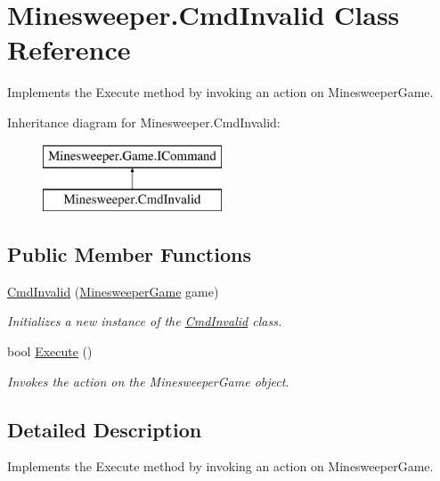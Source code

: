 \hypertarget{class_minesweeper_1_1_cmd_invalid}{\section{Minesweeper.\+Cmd\+Invalid Class Reference}
\label{class_minesweeper_1_1_cmd_invalid}
}


Implements the Execute method by invoking an action on Minesweeper\+Game.  


Inheritance diagram for Minesweeper.\+Cmd\+Invalid\+:\begin{figure}[H]
\begin{center}
\leavevmode
\includegraphics[height=2.000000cm]{class_minesweeper_1_1_cmd_invalid}
\end{center}
\end{figure}
\subsection*{Public Member Functions}
\begin{DoxyCompactItemize}
\item 
\hyperlink{class_minesweeper_1_1_cmd_invalid_a7bfd65d59c12ac6f90b82772e562a288}{Cmd\+Invalid} (\hyperlink{class_minesweeper_1_1_game_1_1_minesweeper_game}{Minesweeper\+Game} game)
\begin{DoxyCompactList}\small\item\em Initializes a new instance of the \hyperlink{class_minesweeper_1_1_cmd_invalid}{Cmd\+Invalid} class. \end{DoxyCompactList}\item 
bool \hyperlink{class_minesweeper_1_1_cmd_invalid_a7d6834d857c3159a20160c2eb94c557e}{Execute} ()
\begin{DoxyCompactList}\small\item\em Invokes the action on the Minesweeper\+Game object. \end{DoxyCompactList}\end{DoxyCompactItemize}


\subsection{Detailed Description}
Implements the Execute method by invoking an action on Minesweeper\+Game. 




